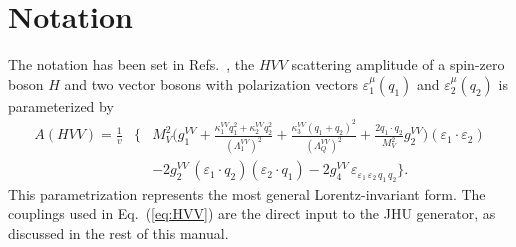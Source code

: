 \documentclass[aps,superscriptaddress,nofootinbib]{revtex4}
\begin{document}


\section{Notation}

The notation has been set in Refs.~\cite{Gao:2010qx,Bolognesi:2012,Anderson:2013,Gritsan:2016hjl,Gritsan:2020pib,Davis:2022},
the $HVV$ scattering amplitude of a spin-zero boson $H$ and two vector bosons with polarization vectors 
$\varepsilon_{1}^\mu(q_1)$ and $\varepsilon_{2}^\mu(q_2)$
is parameterized by
\begin{eqnarray}
  A({H V V}) \!=\! \frac{1}{v} &\bigg\{  &
                          M_V^2 \bigg(g_{1}^{VV} 
+ \frac{\kappa_1^{VV}q_{1}^2 + \kappa_2^{VV} q_{2}^{2}}{\left(\Lambda_{1}^{VV} \right)^{2}} + \frac{\kappa_3^{VV} (q_1+q_2)^2}{\left(\Lambda_{Q}^{VV} \right)^{2}} 
+ \frac{2 q_1\cdot q_2}{M_V^2} g_2^{VV}\bigg) (\varepsilon_1 \cdot \varepsilon_2) 
\nonumber \\ &&
                        -2 g_2^{VV} \, {(\varepsilon_1 \cdot q_2)(\varepsilon_2 \cdot q_1)}
                        -2  g_4^{VV} \, {\varepsilon_{\varepsilon_1\,\varepsilon_2\,q_1\,q_2}}
                               \bigg\}.
\label{eq:HVV}
\end{eqnarray}
This parametrization represents the most general Lorentz-invariant form. 
The couplings used in Eq.~(\ref{eq:HVV}) are the direct input to the JHU generator, as discussed
in the rest of this manual. 
\end{document}
